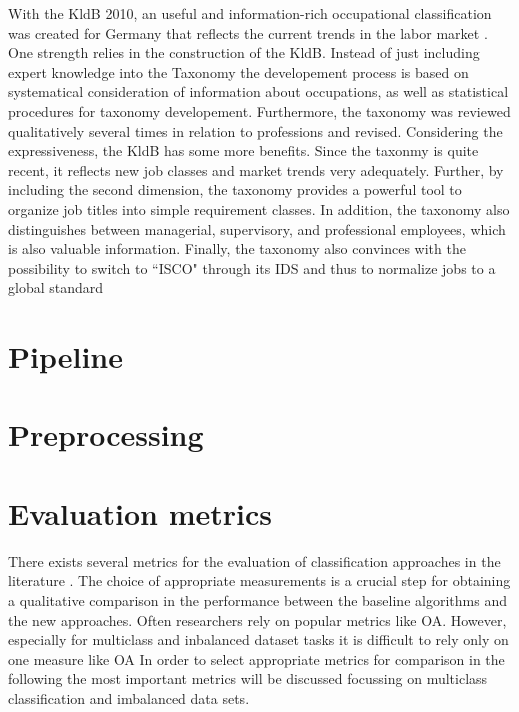 \documentclass[12pt, a4paper, titlepage]{article}
\begin{document}
With the KldB 2010, an useful and information-rich occupational classification was created for Germany that reflects the current trends in the labor market \citep{Paulus2013}. One strength relies in the construction of the \ac{KldB}. Instead of just including expert knowledge into the Taxonomy the developement process is based on systematical consideration of information about occupations, as well as statistical procedures for taxonomy developement. Furthermore, the taxonomy was reviewed qualitatively several times in relation to professions and revised. Considering the expressiveness, the \ac{KldB} has some more benefits. Since the taxonmy is quite recent, it reflects new job classes and market trends very adequately. Further, by including the second dimension, the taxonomy provides a powerful tool to organize job titles into simple requirement classes.  In addition, the taxonomy also distinguishes between managerial, supervisory, and professional employees, which is also valuable information. Finally, the taxonomy also convinces with the possibility to switch to ``\ac{ISCO}" through its IDS and thus to normalize jobs to a global standard \citep{Bundesagentur2011b}

\section{Pipeline}
\section{Preprocessing}
\section{Evaluation metrics}

There exists several metrics for the evaluation of classification approaches in the literature \citep{Fatourechi2008}. The choice of appropriate measurements is a crucial step for obtaining a qualitative comparison in the performance between the baseline algorithms and the new approaches. Often researchers rely on popular metrics like \ac{OA}. However, especially for multiclass and inbalanced dataset tasks it is difficult to rely only on one measure like \ac{OA} In order to select appropriate metrics for comparison in the following the most important metrics will be discussed focussing on multiclass classification and imbalanced data sets. 
\end{document}
